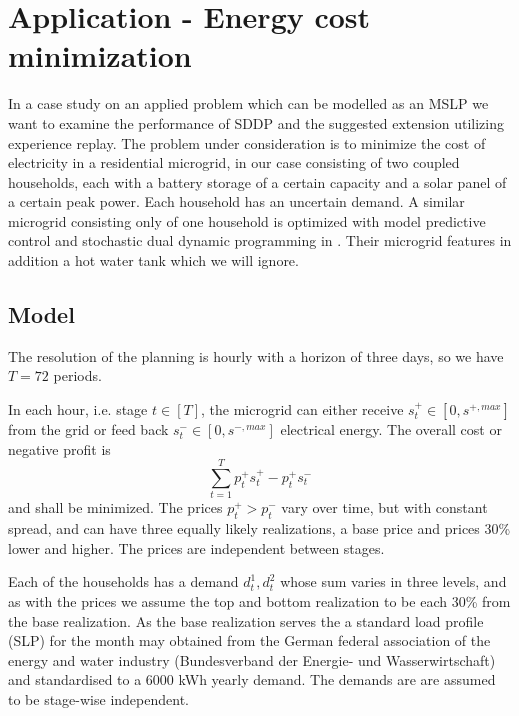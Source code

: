 \documentclass[a4paper,12pt]{article}
\begin{document}


\section{Application - Energy cost minimization}
In a case study on an applied problem which can be modelled as an MSLP we want to examine the performance of SDDP and the suggested extension utilizing experience replay.
The problem under consideration is to minimize the cost of electricity in a residential microgrid, in our case consisting of two coupled households, each with a battery storage of a certain capacity and a solar panel of a certain peak power. Each household has an uncertain demand.
A similar microgrid consisting only of one household is optimized with model predictive control and stochastic dual dynamic programming in \cite{pacaud2022optimization}. Their microgrid features in addition a hot water tank which we will ignore.

\subsection{Model}
The resolution of the planning is hourly with a horizon of three days, so we have $T = 72$ periods.

In each hour, i.e. stage $t \in [T]$, the microgrid can either receive $s^+_t \in [0 , s^{+, max}]$ from the grid or feed back $s^-_t \in [0, s^{-, max}]$ electrical energy.
The overall cost or negative profit is 
\[ \sum_{t=1}^T p^+_t s^+_t  - p^+_t s^-_t\] 
and shall be minimized. The prices $p^+_t > p^-_t$ vary over time, but with constant spread, and can have three equally likely realizations, a base price and prices 30\% lower and higher. The prices are independent between stages.

Each of the households has a demand $d^1_t, d^2_t$ whose sum varies in three levels, and as with the prices we assume the top and bottom realization to be each 30\% from the base realization. As the base realization serves the a standard load profile (SLP) for the month may obtained from the German federal association of the energy and water industry (Bundesverband der Energie- und Wasserwirtschaft) \cite{bdew2017slp} and standardised to a 6000 kWh yearly demand. The demands are are assumed to be stage-wise independent.
\end{document}
